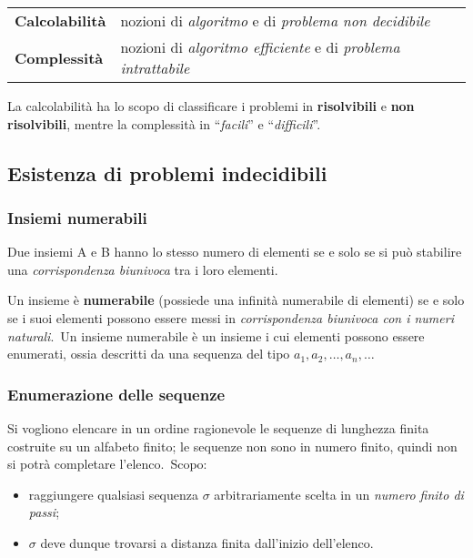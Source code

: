 \begin{table}[H]
    \centering
    \begin{tabular}{l l}
        \textbf{Calcolabilità} & nozioni di \textit{algoritmo} e di \textit{problema non decidibile}          \\
        \textbf{Complessità}   & nozioni di \textit{algoritmo efficiente} e di \textit{problema intrattabile} \\
    \end{tabular}
\end{table}

\noindent La calcolabilità ha lo scopo di classificare i problemi in \textbf{risolvibili} e \textbf{non risolvibili}, mentre la complessità in ``\textit{facili}'' e ``\textit{difficili}''.\

\subsection{Esistenza di problemi indecidibili}

\subsubsection{Insiemi numerabili}

Due insiemi A e B hanno lo stesso numero di elementi se e solo se si può stabilire una \textit{corrispondenza biunivoca} tra i loro elementi.\

Un insieme è \textbf{numerabile} (possiede una infinità numerabile di elementi) se e solo se i suoi elementi possono essere messi in \textit{corrispondenza biunivoca con i numeri naturali}.\
Un insieme numerabile è un insieme i cui elementi possono essere enumerati, ossia descritti da una sequenza del tipo $a_1, a_2,\dots,a_n,\dots$

\subsubsection{Enumerazione delle sequenze}

Si vogliono elencare in un ordine ragionevole le sequenze di lunghezza finita costruite su un alfabeto finito; le sequenze non sono in numero finito, quindi non si potrà completare l'elenco.\
Scopo:
\begin{itemize}
    \item raggiungere qualsiasi sequenza $\sigma$ arbitrariamente scelta in un \textit{numero finito di passi};
    \item $\sigma$ deve dunque trovarsi a distanza finita dall'inizio dell'elenco.
\end{itemize}

